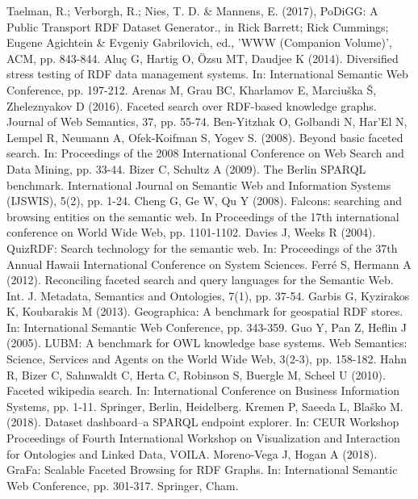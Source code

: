 \begin{thebibliography}{99}
 Taelman, R.; Verborgh, R.; Nies, T. D. \& Mannens, E. (2017), PoDiGG: A Public Transport RDF Dataset Generator., in Rick Barrett; Rick Cummings; Eugene Agichtein \& Evgeniy Gabrilovich, ed., 'WWW (Companion Volume)', ACM, pp. 843-844.
 Alu\c{c} G, Hartig O, \"{O}zsu MT, Daudjee K (2014). Diversified stress testing of RDF data management systems. In: International Semantic Web Conference, pp. 197-212. 
 Arenas M, Grau BC, Kharlamov E, Marciuška Š,  Zheleznyakov D (2016). Faceted search over RDF-based knowledge graphs. Journal of Web Semantics, 37, pp. 55-74.
 Ben-Yitzhak O, Golbandi N, Har'El N, Lempel R, Neumann A, Ofek-Koifman S, Yogev S. (2008). Beyond basic faceted search. In: Proceedings of the 2008 International Conference on Web Search and Data Mining, pp. 33-44. 
 Bizer C, Schultz A (2009). The Berlin SPARQL benchmark. International Journal on Semantic Web and Information Systems (IJSWIS), 5(2), pp. 1-24.
 Cheng G, Ge W, Qu Y (2008). Falcons: searching and browsing entities on the semantic web. In Proceedings of the 17th international conference on World Wide Web, pp. 1101-1102.
 Davies J, Weeks R (2004). QuizRDF: Search technology for the semantic web. In: Proceedings of the 37th Annual Hawaii International Conference on System Sciences.
 Ferr\'{e} S, Hermann A (2012). Reconciling faceted search and query languages for the Semantic Web. Int. J. Metadata, Semantics and Ontologies, 7(1), pp. 37-54.
 Garbis G, Kyzirakos K, Koubarakis M (2013). Geographica: A benchmark for geospatial RDF stores. In: International Semantic Web Conference, pp. 343-359. 
 Guo Y, Pan Z, Heflin J (2005). LUBM: A benchmark for OWL knowledge base systems. Web Semantics: Science, Services and Agents on the World Wide Web, 3(2-3), pp. 158-182.
 Hahn R, Bizer C, Sahnwaldt C, Herta C, Robinson S, Buergle M, Scheel U (2010). Faceted wikipedia search. In: International Conference on Business Information Systems, pp. 1-11. Springer, Berlin, Heidelberg.
 Kremen P, Saeeda L, Blaško M. (2018). Dataset dashboard–a SPARQL endpoint explorer. In: CEUR Workshop Proceedings of Fourth International Workshop on Visualization and Interaction for Ontologies and Linked Data, VOILA.
 Moreno-Vega J, Hogan A (2018). GraFa: Scalable Faceted Browsing for RDF Graphs. In: International Semantic Web Conference, pp. 301-317. Springer, Cham.

\end{thebibliography}

